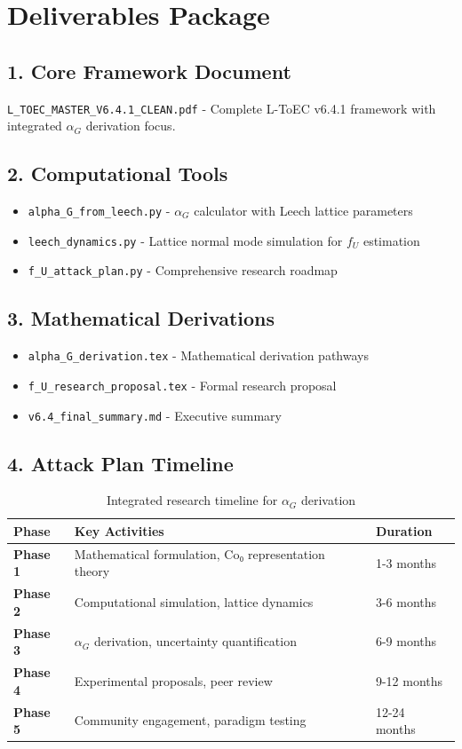 \documentclass[11pt]{article}
\begin{document}
\section{Deliverables Package}

\subsection{1. Core Framework Document}
\texttt{L\_TOEC\_MASTER\_V6.4.1\_CLEAN.pdf} - Complete L-ToEC v6.4.1 framework with integrated $\alpha_G$ derivation focus.

\subsection{2. Computational Tools}
\begin{itemize}
\item \texttt{alpha\_G\_from\_leech.py} - $\alpha_G$ calculator with Leech lattice parameters
\item \texttt{leech\_dynamics.py} - Lattice normal mode simulation for $f_U$ estimation
\item \texttt{f\_U\_attack\_plan.py} - Comprehensive research roadmap
\end{itemize}

\subsection{3. Mathematical Derivations}
\begin{itemize}
\item \texttt{alpha\_G\_derivation.tex} - Mathematical derivation pathways
\item \texttt{f\_U\_research\_proposal.tex} - Formal research proposal
\item \texttt{v6.4\_final\_summary.md} - Executive summary
\end{itemize}

\subsection{4. Attack Plan Timeline}

\begin{table}[h!]
\centering
\begin{tabular}{p{}p{}p{}}
\toprule
\textbf{Phase} & \textbf{Key Activities} & \textbf{Duration} \\
\midrule
\textbf{Phase 1} & Mathematical formulation, Co₀ representation theory & 1-3 months \\
\textbf{Phase 2} & Computational simulation, lattice dynamics & 3-6 months \\
\textbf{Phase 3} & $\alpha_G$ derivation, uncertainty quantification & 6-9 months \\
\textbf{Phase 4} & Experimental proposals, peer review & 9-12 months \\
\textbf{Phase 5} & Community engagement, paradigm testing & 12-24 months \\
\bottomrule
\end{tabular}
\caption{Integrated research timeline for $\alpha_G$ derivation}
\end{table}
\end{document}
